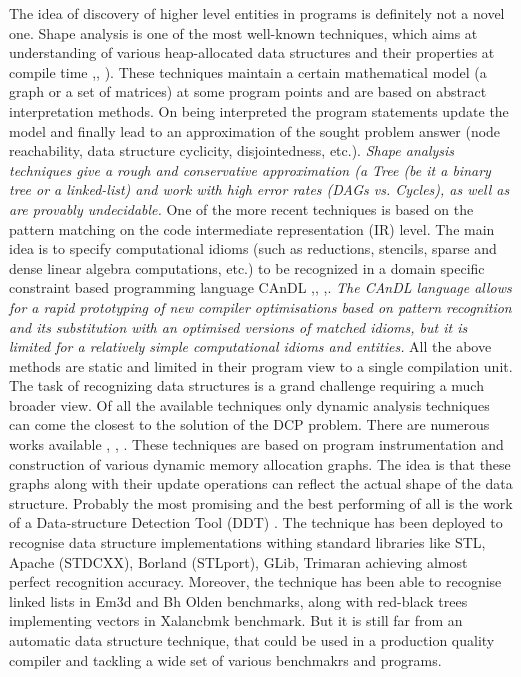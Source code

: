 \begin{description}[style=unboxed,leftmargin=0cm]
\item[Background work] The idea of discovery of higher level entities in programs is definitely not a novel one. Shape analysis is one of the most well-known techniques, which aims at understanding of various heap-allocated data structures and their properties at compile time \cite{Sagiv:1999:PSA:292540.292552},\cite{Wilhelm:2000:SA:647476.760384}, \cite{Ghiya:1996:TDC:237721.237724}). These techniques maintain a certain mathematical model (a graph or a set of matrices) at some program points and are based on abstract interpretation methods. On being interpreted the program statements update the model and finally lead to an approximation of the sought problem answer (node reachability, data structure cyclicity, disjointedness, etc.). \textit{Shape analysis techniques give a rough and conservative approximation (a \textit{Tree} (be it a binary tree or a linked-list) and work with high error rates (\textit{DAGs} vs. \textit{Cycles}), as well as are provably undecidable.} One of the more recent techniques is based on the pattern matching on the code intermediate representation (IR) level. The main idea is to specify computational idioms (such as reductions, stencils, sparse and dense linear algebra computations, etc.) to be recognized in a domain specific constraint based programming language CAnDL \cite{Ginsbach:2018:CDS:3178372.3179515},\cite{Ginsbach:2017:DEG:3049832.3049862}, \cite{Ginsbach:2018:AML:3296957.3173182},\cite{Ginsbach:2018:AML:3296957.3173182}. \textit{The CAnDL language allows for a rapid prototyping of new compiler optimisations based on pattern recognition and its substitution with an optimised versions of matched idioms, but it is limited for a relatively simple computational idioms and entities.} 
\quad All the above methods are static and limited in their program view to a single compilation unit. The task of recognizing data structures is a grand challenge requiring a much broader view. Of all the available techniques only dynamic analysis techniques can come the closest to the solution of the DCP problem. There are numerous works available \cite{Rupprecht:2017:DID:3155562.3155607}\cite{Haller:2016:SDS:2938006.2938029}, \cite{Haller:2016:SDS:2938006.2938029}, \cite{Rupprecht:2017:DID:3155562.3155607}. These techniques are based on program instrumentation and construction of various dynamic memory allocation graphs. The idea is that these graphs along with their update operations can reflect the actual shape of the data structure. Probably the most promising and the best performing of all is the work of a Data-structure Detection Tool (DDT) \cite{1669122}. The technique has been deployed to recognise data structure implementations withing standard libraries like STL, Apache (STDCXX), Borland (STLport), GLib, Trimaran achieving almost perfect recognition accuracy. Moreover, the technique has been able to recognise linked lists in Em3d and Bh Olden benchmarks, along with red-black trees implementing vectors in Xalancbmk benchmark. But it is still far from an automatic data structure technique, that could be used in a production quality compiler and tackling a wide set of various benchmakrs and programs.

\end{description}
